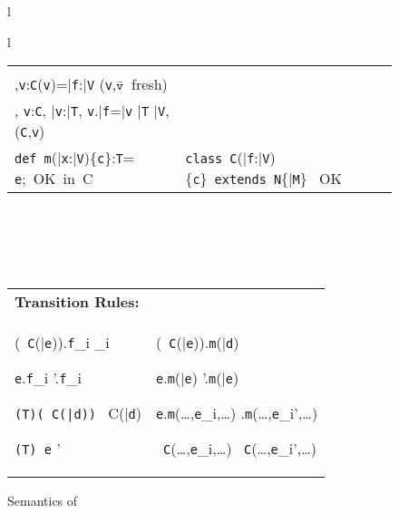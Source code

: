 \begin{figure*}
\begin{tabular}{l}
{\begin{tabular}{l}
\begin{tabular}{p{}p{}}
&
\infrule[T-NEW]
{\Gamma \vdash \bar{\tt e}:\bar{\tt T} \andalso \\ 
\Gamma,{\tt v}:{\tt C}\vdash \fields({\tt v})=\bar{\tt f}:\bar{\tt V}  \andalso \mbox{({\tt v},$\bar{\tt v}$\ fresh)}\\
\Gamma, {\tt v}:{\tt C}, \bar{\tt v}:\bar{\tt T}, {\tt v}.\bar{\tt f}=\bar{\tt v} 
\vdash \bar{\tt T} \subtype \bar{\tt V}, \inv({\tt C},{\tt v})}
{\Gamma \vdash \new\ {\tt C}(\bar{\tt e}): C\{\bar{\tt v}:\bar{\tt T}; \self.\bar{\tt f}=\bar{\tt v},\inv({\tt C},\self)\}} \\
\infrule[Method OK]
{\this:{\tt C}, \bar{\tt x}:\bar{\tt V},{\tt c} \vdash {\tt T} \ \type, \bar{\tt V} \ \type, {\tt e}:{\tt U}, {\tt U} \subtype {\tt T}}
{{\tt def}\ {\tt m}(\bar{\tt x}:\bar{\tt V})\{{\tt c}\}:{\tt T}= {\tt e};\ \mbox{OK in}\ C}
&
\infrule[Class OK]
{\bar{\tt M}\ \mbox{OK in}\ {\tt C} \andalso \this:{\tt C},{\tt c} \vdash \bar{\tt V}\ \type, {\tt N}\ \type}
{\mbox{\tt class}\ {\tt C}(\bar{\tt f}:\bar{\tt V})\{{\tt c}\}\ \mbox{\tt extends}\ {\tt N}\{\bar{\tt M}\} \ \mbox{OK}}
\end{tabular}
\\ 
\end{tabular}}\\
\quad\\
\begin{tabular}{p{}@{\quad}p{}}
\multicolumn{2}{l}{\bf Transition Rules:}\\
\typicallabel{RC-Field}
\infrule[\RField]%
{\tt x:C\} \vdash \fields(\tt x)=\bar{\tt f}:\bar{\tt V}}
{(\new\ {\tt C}(\bar{\tt e})).{\tt f}_i \derives {\tt e}_i}

\infrule[\RCField]%
{{\tt e} \derives {{\tt e}}'}
{{\tt e}.{\tt f}_i \derives {{\tt e}}'.{\tt f}_i}

\infrule[\RCast]%
{\vdash {\tt C} \subtype {\tt T[\new\ C(\bar{\tt d})/\self]}}
{{\tt (T)(\new\ C(\bar{\tt d}))} \derives \new\ C(\bar{\tt d})}


\infrule[\RCCast]%
{{\tt e} \derives {{\tt e}}'}
{{\tt (T) e} \derives {{\tt (T) e}}'}
&
\typicallabel{R-Invk-Recv}
\infrule[\RInvk]
{{\tt x:C}\vdash {\tt x}\has m(\bar{\tt x}:\bar{T})\{c\}:T=e}
{(\new\ {\tt C}(\bar{\tt e})).{\tt m}(\bar{\tt d}) \derives {\tt e[\new\ {\tt C}(\bar{\tt e}),\bar{\tt d}/\this,\bar{\tt x}]}}

\infrule[\RCInvkRecv]%
{{\tt e} \derives {{\tt e}}'}
{{\tt e}.{\tt m}(\bar{\tt e}) \derives {{\tt e}}'.{\tt m}(\bar{\tt e})}

\infrule[\RCInvkArg]%
{{\tt e}_i \derives {{\tt e}_i}'}
{{\tt e}.{\tt m}(\ldots,{\tt e}_i,\ldots) \derives {{\tt e}}.{\tt m}(\ldots,{\tt e}_i',\ldots)} 

\infrule[\RCNewArg]%
{{\tt e}_i \derives {{\tt e}_i}'}
{\new\ {\tt C}(\ldots,{\tt e}_i,\ldots) \derives \new\ {\tt C}(\ldots,{\tt e}_i',\ldots)}
\end{tabular}
\end{tabular}  
 \caption{Semantics of \FX}\label{fig:FX}
\end{figure*}
